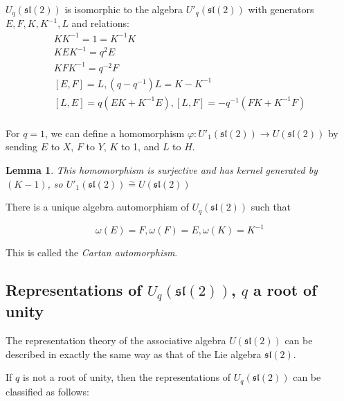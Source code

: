 \documentclass[]{article}
\newtheorem{lemma}[theorem]{Lemma}
\numberwithin{equation}{subsection}
\begin{document}

$U_q(\mathfrak{sl}(2))$ is isomorphic to the algebra $U'_q(\mathfrak{sl}(2))$ with generators $E,F,K,K^{-1},L$ and relations:
\begin{equation}
    \begin{gathered}
    KK^{-1} = 1 = K^{-1}K \\
    KEK^{-1} = q^2 E \\
    KFK^{-1} = q^{-2} F \\
    [E,F] = L, (q - q^{-1})L = K-K^{-1} \\
    [L,E] = q(EK + K^{-1}E), [L,F] = -q^{-1}(FK + K^{-1}F) \\
    \end{gathered}
\end{equation}



For $q=1$, we can define a homomorphism $\varphi: U'_1(\mathfrak{sl}(2)) \to
U(\mathfrak{sl}(2))$ by sending $E$ to $X$, $F$ to $Y$, $K$ to 1, and $L$ to $H$. 
\begin{lemma}
This homomorphism is surjective and has kernel generated by $(K-1)$, so
$U'_1(\mathfrak{sl}(2)) \stackrel{\sim}{=} U(\mathfrak{sl}(2))$
\end{lemma}
There is a unique algebra automorphism of $U_q(\mathfrak{sl}(2))$ such that 

\begin{equation}
    \omega(E) = F, \omega(F) = E, \omega(K) = K^{-1}
\end{equation}

This is called the \emph{Cartan automorphism}.

\subsection{Representations of $U_q(\mathfrak{sl}(2))$, $q$ a root of unity}

The representation theory of the associative algebra $U(\mathfrak{sl}(2))$ can
be described in exactly the same way as that of the Lie algebra
$\mathfrak{sl}(2)$. 

If $q$ is not a root of unity, then the representations of $U_q(\mathfrak{sl}(2))$ can be classified as follows: 
\end{document}
